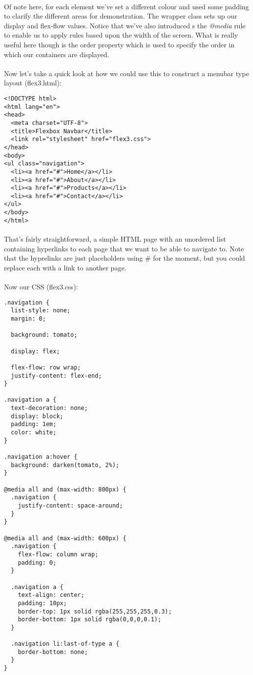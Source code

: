 \documentclass[10pt, a4paper]{article}
\begin{document}
\paragraph{} Of note here, for each element we've set a different colour and used some padding to clarify the different areas for demonstration. The wrapper class sets up our display and flex-flow values. Notice that we've also introduced s the \emph{@media} rule to enable us to apply rules based upon the width of the screen. What is really useful here though is the order property which is used to specify the order in which our containers are displayed.

\paragraph{} Now let's take a quick look at how we could use this to construct a menubar type layout (flex3.html):
\begin{lstlisting}
<!DOCTYPE html>
<html lang="en">
<head>
  <meta charset="UTF-8">
  <title>Flexbox Navbar</title>
  <link rel="stylesheet" href="flex3.css">
</head>
<body>
<ul class="navigation">
  <li><a href="#">Home</a></li>
  <li><a href="#">About</a></li>
  <li><a href="#">Products</a></li>
  <li><a href="#">Contact</a></li>
</ul>
</body>
</html>
\end{lstlisting}
\paragraph{} That's fairly straightforward, a simple HTML page with an unordered list containing hyperlinks to each page that we want to be able to navigate to. Note that the hyprelinks are just placeholders using \# for the moment, but you could replace each with a link to another page.

\paragraph{} Now our CSS (flex3.css):
\begin{lstlisting}
.navigation {
  list-style: none;
  margin: 0; 
  
  background: tomato;
  
  display: flex;
  
  flex-flow: row wrap;
  justify-content: flex-end;
}

.navigation a {
  text-decoration: none;
  display: block;
  padding: 1em;
  color: white;
}

.navigation a:hover {
  background: darken(tomato, 2%);
}

@media all and (max-width: 800px) {
  .navigation {
    justify-content: space-around;
  }
}

@media all and (max-width: 600px) {
  .navigation {
    flex-flow: column wrap;
    padding: 0;
  }
  
  .navigation a { 
    text-align: center; 
    padding: 10px;
    border-top: 1px solid rgba(255,255,255,0.3); 
    border-bottom: 1px solid rgba(0,0,0,0.1); 
  }
  
  .navigation li:last-of-type a {
    border-bottom: none;
  }
}
\end{lstlisting}
\end{document}
